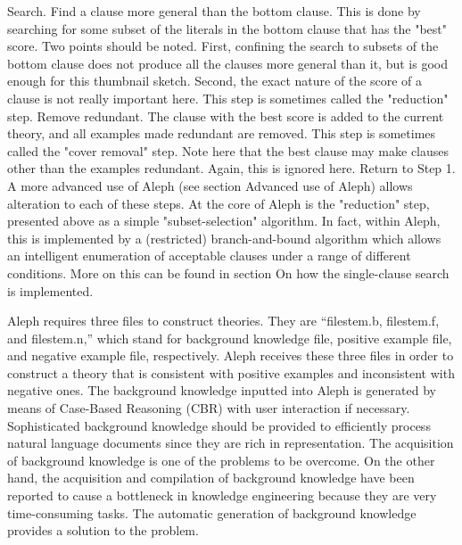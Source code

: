 Search. Find a clause more general than the bottom clause. This is done by searching for some subset of the literals in the bottom clause that has the "best" score. Two points should be noted. First, confining the search to subsets of the bottom clause does not produce all the clauses more general than it, but is good enough for this thumbnail sketch. Second, the exact nature of the score of a clause is not really important here. This step is sometimes called the "reduction" step.
Remove redundant. The clause with the best score is added to the current theory, and all examples made redundant are removed. This step is sometimes called the "cover removal" step. Note here that the best clause may make clauses other than the examples redundant. Again, this is ignored here. Return to Step 1.
A more advanced use of Aleph (see section Advanced use of Aleph) allows alteration to each of these steps. At the core of Aleph is the "reduction" step, presented above as a simple "subset-selection" algorithm. In fact, within Aleph, this is implemented by a (restricted) branch-and-bound algorithm which allows an intelligent enumeration of acceptable clauses under a range of different conditions. More on this can be found in section On how the single-clause search is implemented.



Aleph requires three files to construct theories. They are “filestem.b, filestem.f, and filestem.n,” which stand for background knowledge file, positive example file, and negative example file, respectively. Aleph receives these three files in order to construct a theory that is consistent with positive examples and inconsistent with negative ones.
The background knowledge inputted into Aleph is generated by means of Case-Based Reasoning (CBR) with user interaction if necessary. Sophisticated background knowledge should be provided to efficiently process natural language documents since they are rich in representation. The acquisition of background knowledge is one of the problems to be overcome. On the other hand, the acquisition and compilation of background knowledge have been reported to cause a bottleneck in knowledge engineering because they are very time-consuming tasks. The automatic generation of background knowledge provides a solution to the problem.

